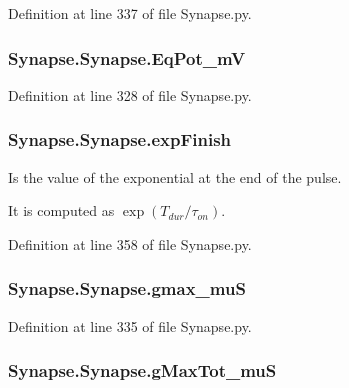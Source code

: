 Definition at line 337 of file Synapse.\-py.

\hypertarget{class_synapse_1_1_synapse_adc80e9a62c17b29a92c2e7a0413e572d}{
\subsubsection[{Eq\-Pot\-\_\-m\-V}]{\setlength{\rightskip}{0pt plus 5cm}Synapse.\-Synapse.\-Eq\-Pot\-\_\-m\-V}}\label{class_synapse_1_1_synapse_adc80e9a62c17b29a92c2e7a0413e572d}


Definition at line 328 of file Synapse.\-py.

\hypertarget{class_synapse_1_1_synapse_aa9ae256b272ceb8e9e4a931a9cd5d163}{
\subsubsection[{exp\-Finish}]{\setlength{\rightskip}{0pt plus 5cm}Synapse.\-Synapse.\-exp\-Finish}}\label{class_synapse_1_1_synapse_aa9ae256b272ceb8e9e4a931a9cd5d163}


Is the value of the exponential at the end of the pulse. 

It is computed as $\exp(T_{dur}/\tau_{on})$. 

Definition at line 358 of file Synapse.\-py.

\hypertarget{class_synapse_1_1_synapse_a7922dac4765183cb6052905cc0d251cb}{
\subsubsection[{gmax\-\_\-mu\-S}]{\setlength{\rightskip}{0pt plus 5cm}Synapse.\-Synapse.\-gmax\-\_\-mu\-S}}\label{class_synapse_1_1_synapse_a7922dac4765183cb6052905cc0d251cb}


Definition at line 335 of file Synapse.\-py.

\hypertarget{class_synapse_1_1_synapse_a470750725ecb176e048a973b9dc23ea3}{
\subsubsection[{g\-Max\-Tot\-\_\-mu\-S}]{\setlength{\rightskip}{0pt plus 5cm}Synapse.\-Synapse.\-g\-Max\-Tot\-\_\-mu\-S}}\label{class_synapse_1_1_synapse_a470750725ecb176e048a973b9dc23ea3}



